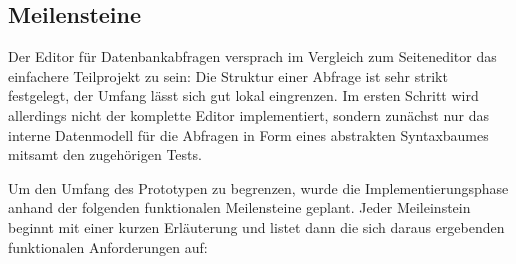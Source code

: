 \subsection{Meilensteine}
\label{sec:implementation-roadmap}

Der Editor für Datenbankabfragen versprach im Vergleich zum Seiteneditor das einfachere Teilprojekt zu sein: Die Struktur einer Abfrage ist sehr strikt festgelegt, der Umfang lässt sich gut lokal eingrenzen. Im ersten Schritt wird allerdings nicht der komplette Editor implementiert, sondern zunächst nur das interne Datenmodell für die Abfragen in Form eines abstrakten Syntaxbaumes mitsamt den zugehörigen Tests.

Um den Umfang des Prototypen zu begrenzen, wurde die Implementierungsphase anhand der folgenden funktionalen Meilensteine geplant. Jeder Meileinstein beginnt mit einer kurzen Erläuterung und listet dann die sich daraus ergebenden funktionalen Anforderungen auf:

